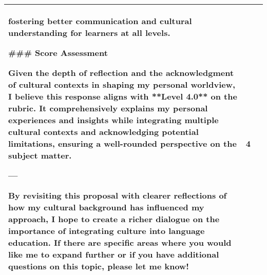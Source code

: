 \begin{center}
\begin{longtable}{|p{}|p{}|p{}|}
fostering better communication and cultural understanding for learners at all levels.\par \#\#\# Score Assessment\par Given the depth of reflection and the acknowledgment of cultural contexts in shaping my personal worldview, I believe this response aligns with **Level 4.0** on the rubric. It comprehensively explains my personal experiences and insights while integrating multiple cultural contexts and acknowledging potential limitations, ensuring a well-rounded perspective on the subject matter. \par ---\par By revisiting this proposal with clearer reflections of how my cultural background has influenced my approach, I hope to create a richer dialogue on the importance of integrating culture into language education. If there are specific areas where you would like me to expand further or if you have additional questions on this topic, please let me know! & 4 \\
\hline

\end{longtable}
\end{center}
